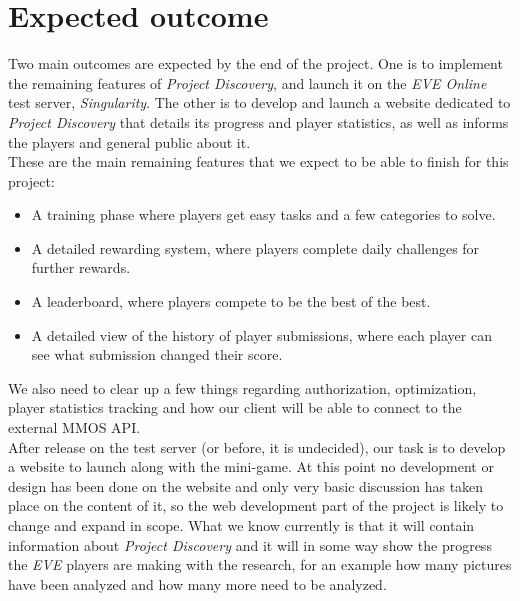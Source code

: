 \section{Expected outcome}\label{sec:expected_outcome}


Two main outcomes are expected by the end of the project. One is to implement the remaining features of \emph{Project Discovery}, and launch it on the \emph{EVE Online} test server, \emph{Singularity}. The other is to develop and launch a website dedicated to \emph{Project Discovery} that details its progress and player statistics, as well as informs the players and general public about it.\\

These are the main remaining features that we expect to be able to finish for this project:
\begin{itemize}
  \item A training phase where players get easy tasks and a few categories to solve.
  \item A detailed rewarding system, where players complete daily challenges for further rewards.
  \item A leaderboard, where players compete to be the best of the best.
  \item A detailed view of the history of player submissions, where each player can see what submission changed their score.
\end{itemize}

We also need to clear up a few things regarding authorization, optimization, player statistics tracking and how our client will be able to connect to the external MMOS API.\\

After release on the test server (or before, it is undecided), our task is to develop a website to launch along with the mini-game. At this point no development or design has been done on the website and only very basic discussion has taken place on the content of it, so the web development part of the project is likely to change and expand in scope. What we know currently is that it will contain information about \emph{Project Discovery} and it will in some way show the progress the \emph{EVE} players are making with the research, for an example how many pictures have been analyzed and how many more need to be analyzed.
